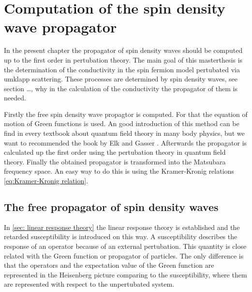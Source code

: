 %
%
%
\chapter{Computation of the spin density wave propagator}
\label{ch: propagator}
%
%
%
In the present chapter the propagator of spin density waves should be computed up to the first order in pertubation theory.
The main goal of this masterthesis is the determination of the conductivity in the spin fermion model pertubated via umklapp scattering.
These processes are determined by spin density waves, see section \dots {}, why in the calculation of the conductivity the propagator of them is needed.

Firstly the free spin density wave propagtor is computed.
For that the equation of motion of Green functions is used. 
An good introduction of this method can be find in every textbook about quantum field theory in many body physics, but we want to recommended the book by Elk and Gasser \cite{Elk&Gasser}.
Afterwards the propagator is calculated up the first order using the pertubation theory in quantum field theory.
Finally the obtained propagator is transformed into the Matsubara frequency space.
An easy way to do this is using the Kramer-Kronig relations \eqref{eq:Kramer-Kronig relation}.
%
%
\section{The free propagator of spin density waves}
\label{sec: free propagator}
%
%
In \ref{sec: linear response theory} the linear response theory is established and the retarded susceptibility is introduced on this way.
A susceptibility describes the response of an operator because of an external pertubation.
This quantity is close related with the Green function or propagator of particles.
The only difference is that the operators and the expectation value of the Green function are represented in the Heisenberg picture comparing to the susceptibility, where them are represented with respect to the unpertubated system.

